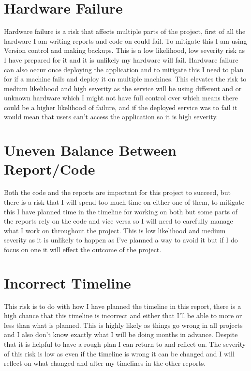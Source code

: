 \documentclass[]{project_report}
\begin{document}
\section{Hardware Failure}
Hardware failure is a risk that affects multiple parts of the project, first of all the hardware I am writing reports and code on could fail. To mitigate this I am using Version control and making backups. This is a low likelihood, low severity risk as I have prepared for it and it is unlikely my hardware will fail. Hardware failure can also occur once deploying the application and to mitigate this I need to plan for if a machine fails and deploy it on multiple machines. This elevates the risk to medium likelihood and high severity as the service will be using different and or unknown hardware which I might not have full control over which means there could be a higher likelihood of failure, and if the deployed service was to fail it would mean that users can't access the application so it is high severity.

\section{Uneven Balance Between Report/Code}

Both the code and the reports are important for this project to succeed, but there is a risk that I will spend too much time on either one of them, to mitigate this I have planned time in the timeline for working on both but some parts of the reports rely on the code and vice versa so I will need to carefully manage what I work on throughout the project. This is low likelihood and medium severity as it is unlikely to happen as I've planned a way to avoid it but if I do focus on one it will effect the outcome of the project. 

\section{Incorrect Timeline}

This risk is to do with how I have planned the timeline in this report, there is a high chance that this timeline is incorrect and either that I'll be able to more or less than what is planned. This is highly likely as things go wrong in all projects and I also don't know exactly what I will be doing months in advance. Despite that it is helpful to have a rough plan I can return to and reflect on. The severity of this risk is low as even if the timeline is wrong it can be changed and I will reflect on what changed and alter my timelines in the other reports.
\end{document}
